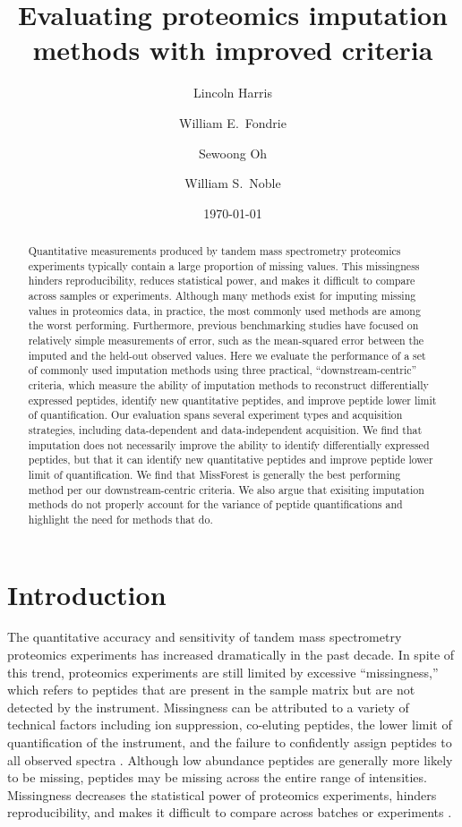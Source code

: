 \documentclass{article}
\title{Evaluating proteomics imputation methods with improved criteria}
\author[1]{Lincoln Harris}
\author[2]{William E.\ Fondrie}
\author[3]{Sewoong Oh}
\author[1,3]{William S.\ Noble}
\affil[1]{Department of Genome Sciences, University of Washington}
\affil[2]{Talus Biosciences}
\affil[3]{Paul G.\ Allen School of Computer Science and Engineering,
  University of Washington}
\date{\today}
\begin{document}
\maketitle

\begin{abstract}
Quantitative measurements produced by tandem mass spectrometry proteomics experiments typically contain a large proportion of missing values. This missingness hinders reproducibility, reduces statistical power, and makes it difficult to compare across samples or experiments. Although many methods exist for imputing missing values in proteomics data, in practice, the most commonly used methods are among the worst performing. Furthermore, previous benchmarking studies have focused on relatively simple measurements of error, such as the mean-squared error between the imputed and the held-out observed values.  Here we evaluate the performance of a set of commonly used imputation methods using three  practical, ``downstream-centric'' criteria, which measure the ability of imputation methods to reconstruct differentially expressed peptides, identify new quantitative peptides, and improve peptide lower limit of quantification. Our evaluation spans several experiment types and acquisition strategies, including data-dependent and data-independent acquisition. We find that imputation does not necessarily improve the ability to identify differentially expressed peptides, but that it can identify new quantitative peptides and improve peptide lower limit of quantification. We find that MissForest is generally the best performing method per our downstream-centric criteria. We also argue that exisiting imputation methods do not properly account for the variance of peptide quantifications and highlight the need for methods that do.
\end{abstract}

\section{Introduction}

The quantitative accuracy and sensitivity of tandem mass spectrometry proteomics experiments has increased dramatically in the past decade. In spite of this trend, proteomics experiments are still limited by excessive ``missingness,'' which refers to peptides that are present in the sample matrix but are not detected by the instrument. Missingness can be attributed to a variety of technical factors including ion suppression, co-eluting peptides, the lower limit of quantification of the instrument, and the failure to confidently assign peptides to all observed spectra \cite{Bramer:review, Webb-Robertson:review}. Although low abundance peptides are generally more likely to be missing, peptides may be missing across the entire range of intensities. Missingness decreases the statistical power of proteomics experiments, hinders reproducibility, and makes it difficult to compare across batches or experiments \cite{Bramer:review, Webb-Robertson:review}.
\end{document}
